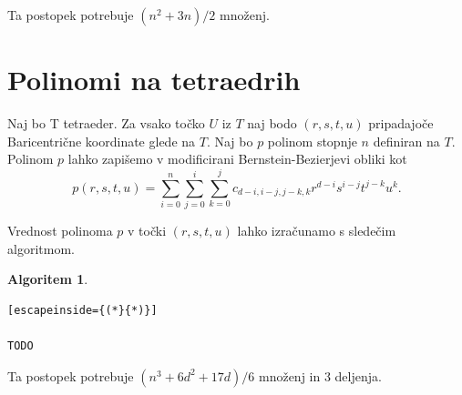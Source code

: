 \documentclass{article}
\newtheorem{algoritm}{Algoritem}[section]
\begin{document}
Ta postopek potrebuje $(n^2+3n)/2$ množenj.


\section{Polinomi na tetraedrih}

Naj bo T tetraeder. Za vsako točko $U$ iz $T$ naj bodo $(r,s,t,u)$ pripadajoče Baricentrične koordinate glede na $T$.  Naj bo $p$ polinom stopnje $n$ definiran na $T$. Polinom $p$ lahko zapišemo v modificirani Bernstein-Bezierjevi obliki kot 
$$p(r,s,t,u) = \sum_{i = 0}^n{\sum_{j=0}^{i}{\sum_{k = 0}^{j}{c_{d-i,i-j,j-k,k} r^{d-i} s^{i-j} t^{j-k} u^k}}}.$$


Vrednost polinoma $p$ v točki $(r,s,t,u)$ lahko izračunamo s sledečim algoritmom.

\begin{algoritm}
\begin{lstlisting}[escapeinside={(*}{*)}]

TODO

\end{lstlisting}
\end{algoritm}

Ta postopek potrebuje $(n^3+ 6d^2 + 17d)/6$ množenj in 3 deljenja.
\end{document}
